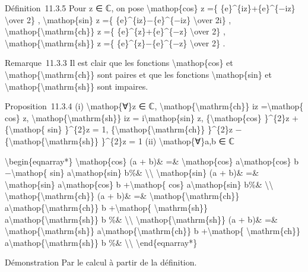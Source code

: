 \documentclass[]{article}
\begin{document}
Définition~11.3.5 Pour z ∈ ℂ, on pose \textbackslash{}mathop\{cos\} z
=\{ \{e\}\^{}\{iz\}+\{e\}\^{}\{−iz\} \textbackslash{}over 2\} ,
\textbackslash{}mathop\{sin\} z =\{ \{e\}\^{}\{iz\}−\{e\}\^{}\{−iz\}
\textbackslash{}over 2i\} ,
\textbackslash{}mathop\{\textbackslash{}mathrm\{ch\}\} z =\{
\{e\}\^{}\{z\}+\{e\}\^{}\{−z\} \textbackslash{}over 2\} ,
\textbackslash{}mathop\{\textbackslash{}mathrm\{sh\}\} z =\{
\{e\}\^{}\{z\}−\{e\}\^{}\{−z\} \textbackslash{}over 2\} .

Remarque~11.3.3 Il est clair que les fonctions
\textbackslash{}mathop\{cos\} et
\textbackslash{}mathop\{\textbackslash{}mathrm\{ch\}\} sont paires et
que les fonctions \textbackslash{}mathop\{sin\} et
\textbackslash{}mathop\{\textbackslash{}mathrm\{sh\}\} sont impaires.

Proposition~11.3.4 (i) \textbackslash{}mathop\{∀\}z ∈ ℂ,
\textbackslash{}mathop\{\textbackslash{}mathrm\{ch\}\} iz
=\textbackslash{}mathop\{ cos\} z,
\textbackslash{}mathop\{\textbackslash{}mathrm\{sh\}\} iz =
i\textbackslash{}mathop\{sin\} z, \{\textbackslash{}mathop\{cos\}
\}\^{}\{2\}z +\{\textbackslash{}mathop\{ sin\} \}\^{}\{2\}z = 1,
\{\textbackslash{}mathop\{\textbackslash{}mathrm\{ch\}\} \}\^{}\{2\}z
−\{\textbackslash{}mathop\{\textbackslash{}mathrm\{sh\}\} \}\^{}\{2\}z =
1 (ii) \textbackslash{}mathop\{∀\}a,b ∈ ℂ

\textbackslash{}begin\{eqnarray*\} \textbackslash{}mathop\{cos\} (a +
b)\& =\& \textbackslash{}mathop\{cos\} a\textbackslash{}mathop\{cos\} b
−\textbackslash{}mathop\{ sin\} a\textbackslash{}mathop\{sin\} b\%\&
\textbackslash{}\textbackslash{} \textbackslash{}mathop\{sin\} (a + b)\&
=\& \textbackslash{}mathop\{sin\} a\textbackslash{}mathop\{cos\} b
+\textbackslash{}mathop\{ cos\} a\textbackslash{}mathop\{sin\} b\%\&
\textbackslash{}\textbackslash{}
\textbackslash{}mathop\{\textbackslash{}mathrm\{ch\}\} (a + b)\& =\&
\textbackslash{}mathop\{\textbackslash{}mathrm\{ch\}\}
a\textbackslash{}mathop\{\textbackslash{}mathrm\{ch\}\} b
+\textbackslash{}mathop\{ \textbackslash{}mathrm\{sh\}\}
a\textbackslash{}mathop\{\textbackslash{}mathrm\{sh\}\} b \%\&
\textbackslash{}\textbackslash{}
\textbackslash{}mathop\{\textbackslash{}mathrm\{sh\}\} (a + b)\& =\&
\textbackslash{}mathop\{\textbackslash{}mathrm\{sh\}\}
a\textbackslash{}mathop\{\textbackslash{}mathrm\{ch\}\} b
+\textbackslash{}mathop\{ \textbackslash{}mathrm\{ch\}\}
a\textbackslash{}mathop\{\textbackslash{}mathrm\{sh\}\} b \%\&
\textbackslash{}\textbackslash{} \textbackslash{}end\{eqnarray*\}

Démonstration Par le calcul à partir de la définition.
\end{document}
